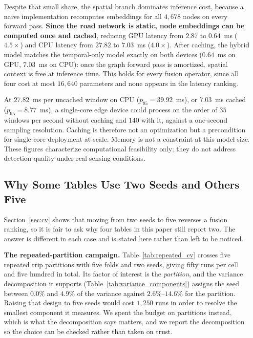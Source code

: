 \documentclass[journal]{IEEEtran}
\begin{document}
Despite that small share, the spatial branch dominates inference cost, because a naive implementation recomputes embeddings for all $4{,}678$ nodes on every forward pass. \textbf{Since the road network is static, node embeddings can be computed once and cached}, reducing GPU latency from $2.87$ to $0.64$~ms ($4.5\times$) and CPU latency from $27.82$ to $7.03$~ms ($4.0\times$). After caching, the hybrid model matches the temporal-only model exactly on both devices ($0.64$~ms on GPU, $7.03$~ms on CPU): once the graph forward pass is amortized, spatial context is free at inference time. This holds for every fusion operator, since all four cost at most $16{,}640$ parameters and none appears in the latency ranking.

At $27.82$~ms per uncached window on CPU ($p_{95} = 39.92$~ms), or $7.03$~ms cached ($p_{95} = 8.77$~ms), a single-core edge device could process on the order of $35$ windows per second without caching and $140$ with it, against a one-second sampling resolution. Caching is therefore not an optimization but a precondition for single-core deployment at scale. Memory is not a constraint at this model size. These figures characterize computational feasibility only; they do not address detection quality under real sensing conditions.

\subsection{Why Some Tables Use Two Seeds and Others Five}
\label{sec:seed_budget}
Section~\ref{sec:cv} shows that moving from two seeds to five reverses a fusion ranking, so it is fair to ask why four tables in this paper still report two. The answer is different in each case and is stated here rather than left to be noticed.

\textbf{The repeated-partition campaign.} Table~\ref{tab:repeated_cv} crosses five repeated trip partitions with five folds and two seeds, giving fifty runs per cell and five hundred in total. Its factor of interest is the \emph{partition}, and the variance decomposition it supports (Table~\ref{tab:variance_components}) assigns the seed between $0.0\%$ and $4.9\%$ of the variance against $2.6\%$--$14.6\%$ for the partition. Raising that design to five seeds would cost $1{,}250$ runs in order to resolve the smallest component it measures. We spent the budget on partitions instead, which is what the decomposition says matters, and we report the decomposition so the choice can be checked rather than taken on trust.
\end{document}
